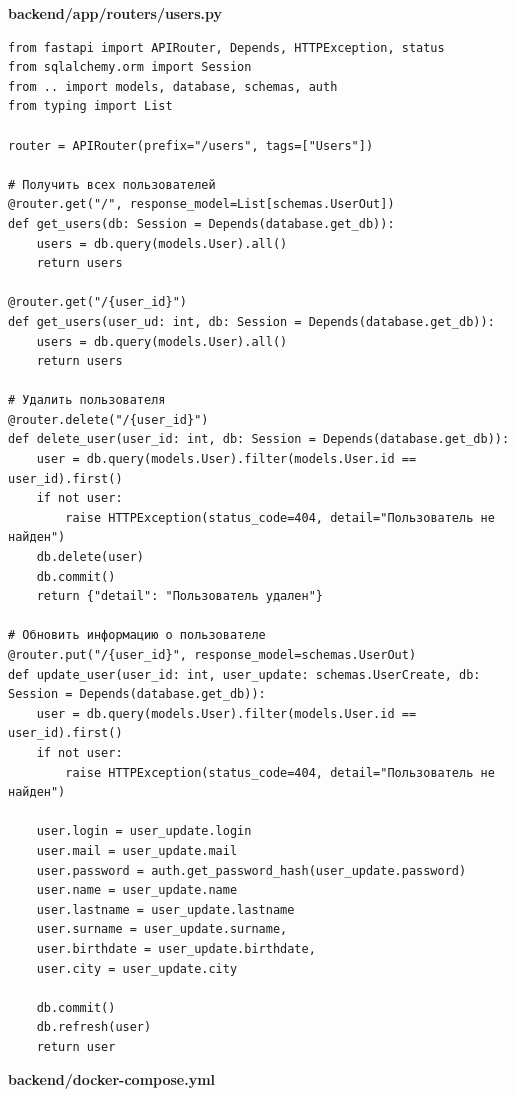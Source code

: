 \documentclass[coursework]{SCWorks}
\begin{document}
\begin{center}
\textbf{backend/app/routers/users.py}
\end{center}

\begin{verbatim}
from fastapi import APIRouter, Depends, HTTPException, status
from sqlalchemy.orm import Session
from .. import models, database, schemas, auth
from typing import List

router = APIRouter(prefix="/users", tags=["Users"])

# Получить всех пользователей
@router.get("/", response_model=List[schemas.UserOut])
def get_users(db: Session = Depends(database.get_db)):
    users = db.query(models.User).all()
    return users

@router.get("/{user_id}")
def get_users(user_ud: int, db: Session = Depends(database.get_db)):
    users = db.query(models.User).all()
    return users

# Удалить пользователя
@router.delete("/{user_id}")
def delete_user(user_id: int, db: Session = Depends(database.get_db)):
    user = db.query(models.User).filter(models.User.id == user_id).first()
    if not user:
        raise HTTPException(status_code=404, detail="Пользователь не найден")
    db.delete(user)
    db.commit()
    return {"detail": "Пользователь удален"}

# Обновить информацию о пользователе
@router.put("/{user_id}", response_model=schemas.UserOut)
def update_user(user_id: int, user_update: schemas.UserCreate, db: Session = Depends(database.get_db)):
    user = db.query(models.User).filter(models.User.id == user_id).first()
    if not user:
        raise HTTPException(status_code=404, detail="Пользователь не найден")
    
    user.login = user_update.login
    user.mail = user_update.mail
    user.password = auth.get_password_hash(user_update.password)
    user.name = user_update.name
    user.lastname = user_update.lastname
    user.surname = user_update.surname, 
    user.birthdate = user_update.birthdate, 
    user.city = user_update.city        
    
    db.commit()
    db.refresh(user)
    return user
\end{verbatim}

\begin{center}
\textbf{backend/docker-compose.yml}
\end{center}
\end{document}
